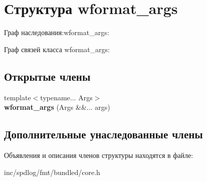 \hypertarget{structwformat__args}{}\section{Структура wformat\+\_\+args}
\label{structwformat__args}


Граф наследования\+:wformat\+\_\+args\+:


Граф связей класса wformat\+\_\+args\+:
\subsection*{Открытые члены}
\begin{DoxyCompactItemize}
\item 
\mbox{\label{structwformat__args_a915fa4681c97d33ae125299160f63674}} 
{\footnotesize template$<$typename... Args$>$ }\\{\bfseries wformat\+\_\+args} (Args \&\&... args)
\end{DoxyCompactItemize}
\subsection*{Дополнительные унаследованные члены}


Объявления и описания членов структуры находятся в файле\+:\begin{DoxyCompactItemize}
\item 
inc/spdlog/fmt/bundled/core.\+h\end{DoxyCompactItemize}
